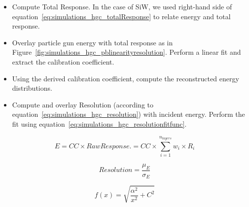 \begin{itemize}
    \item Compute Total Response. In the case of SiW, we used right-hand side of equation~\ref{eq:simulations_hgc_totalResponse} to relate energy and total response.
    \item Overlay particle gun energy with total response as in Figure~\ref{fig:simulations_hgc_pblinearityresolution}. Perform a linear fit and extract the calibration coefficient.
    \item Using the derived calibration coefficient, compute the reconstructed energy distributions.
    \item Compute and overlay Resolution (according to equation~\ref{eq:simulations_hgc_resolution}) with incident energy. Perform the fit using equation~\ref{eq:simulations_hgc_resolutionfitfunc}.
\end{itemize}
\begin{center}
    \begin{equation}
        \label{eq:simulations_hgc_totalResponse}
         {E} = {CC} \times {Raw Response}. = {CC} \times {\sum_{i=1}^{n_{layers}} w_i \times  R_{i}}
    \end{equation}
\end{center}
\begin{center}
    \begin{equation}
        \label{eq:simulations_hgc_resolution}
         {Resolution} = {\frac{\mu_E}{\sigma_E}}
    \end{equation}
\end{center}
\begin{center}
    \begin{equation}
        \label{eq:simulations_hgc_resolutionfitfunc}
         {f(x)} = {\sqrt{\frac{\alpha^2}{x^2} + C^2}}
    \end{equation}
\end{center}

